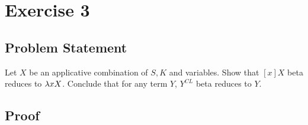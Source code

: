 \chapter{Exercise 3}
\lhead{\today}

\section{Problem Statement}
Let $X$ be an applicative combination of $S,K$ and variables. Show that $[x]X$ beta reduces to $\lambda xX$. Conclude that for any term $Y$, $Y^{CL}$ beta reduces to $Y$.

\section{Proof}
